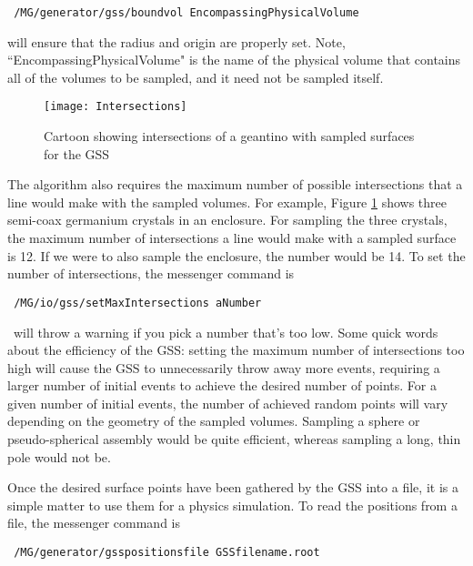\begin{lstlisting}
 /MG/generator/gss/boundvol EncompassingPhysicalVolume
\end{lstlisting}

\noindent will ensure that the radius and origin are properly set.  Note,
``EncompassingPhysicalVolume" is the name of the physical volume that contains
all of the volumes to be sampled, and it need not be sampled itself.

\begin{figure}[h]
\begin{center}
\texttt{[image: Intersections]}
\caption{Cartoon showing intersections of a geantino with sampled surfaces for
the GSS}
\label{fig:intersections}
\end{center}
\end{figure} 

The algorithm also requires the maximum number of possible intersections that a
line would make with the sampled volumes.  For example, Figure
\ref{fig:intersections} shows three semi-coax germanium crystals in an
enclosure.  For sampling the three crystals, the maximum number of intersections
a line would make with a sampled surface is 12.  If we were to also sample the enclosure, the
number would be 14.  To set the number of intersections, the messenger command
is

\begin{lstlisting}
 /MG/io/gss/setMaxIntersections aNumber
\end{lstlisting}

\noindent \mage \ will throw a warning if you pick a number that's too low.  Some
quick words about the efficiency of the GSS: setting the maximum number of
intersections too high will cause the GSS to unnecessarily throw away more
events, requiring a larger number of initial events to achieve the desired
number of points.  For a given number of initial events, the number of achieved
random points will vary depending on the geometry of the sampled volumes.
Sampling a sphere or pseudo-spherical assembly would be quite efficient, whereas sampling a long, thin pole would not be.

Once the desired surface points have been gathered by the GSS into a \rootv
file, it is a simple matter to use them for a physics simulation.  To read the
positions from a file, the messenger command is 

\begin{lstlisting}
 /MG/generator/gsspositionsfile GSSfilename.root
\end{lstlisting}

